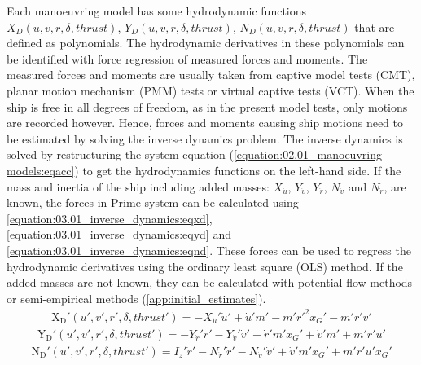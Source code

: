 Each manoeuvring model has some hydrodynamic functions \(X_D(u,v,r,\delta,thrust)\), \(Y_D(u,v,r,\delta,thrust)\), \(N_D(u,v,r,\delta,thrust)\) that are defined as polynomials. The hydrodynamic derivatives in these polynomials can be identified with force regression of measured forces and moments. The measured forces and moments are usually taken from captive model tests (CMT), planar motion mechanism (PMM) tests or virtual captive tests (VCT). When the ship is free in all degrees of freedom, as in the present model tests, only
motions are recorded however. Hence, forces and moments causing ship motions need to be estimated by
solving the inverse dynamics problem.
The inverse dynamics is solved by restructuring the system equation (\autoref{equation:02.01_manoeuvring models:eqacc}) to get the hydrodynamics functions on the left-hand side. If the mass and inertia of the ship including added masses: \(X_{\dot{u}}\), \(Y_{\dot{v}}\), \(Y_{\dot{r}}\), \(N_{\dot{v}}\) and \(N_{\dot{r}}\), are known, the forces in Prime system can be calculated using \autoref{equation:03.01_inverse_dynamics:eqxd}, \autoref{equation:03.01_inverse_dynamics:eqyd} and \autoref{equation:03.01_inverse_dynamics:eqnd}.
These forces can be used to regress the hydrodynamic derivatives using the ordinary least square (OLS) method. If the added masses are not known, they can be calculated with potential flow methods or semi-empirical methods (\autoref{app:initial_estimates}). 
\begin{equation}\label{equation:03.01_inverse_dynamics:eqxd}
\begin{split}\displaystyle \operatorname{X_{D}'}{\left(u',v',r',\delta,thrust' \right)} = - X_{\dot{u}}' \dot{u}' + \dot{u}' m' - m' r'^{2} x_{G}' - m' r' v'\end{split}
\end{equation}\begin{equation}\label{equation:03.01_inverse_dynamics:eqyd}
\begin{split}\displaystyle \operatorname{Y_{D}'}{\left(u',v',r',\delta,thrust' \right)} = - Y_{\dot{r}}' \dot{r}' - Y_{\dot{v}}' \dot{v}' + \dot{r}' m' x_{G}' + \dot{v}' m' + m' r' u'\end{split}
\end{equation}\begin{equation}\label{equation:03.01_inverse_dynamics:eqnd}
\begin{split}\displaystyle \operatorname{N_{D}'}{\left(u',v',r',\delta,thrust' \right)} = I_{z}' \dot{r}' - N_{\dot{r}}' \dot{r}' - N_{\dot{v}}' \dot{v}' + \dot{v}' m' x_{G}' + m' r' u' x_{G}'\end{split}
\end{equation}

